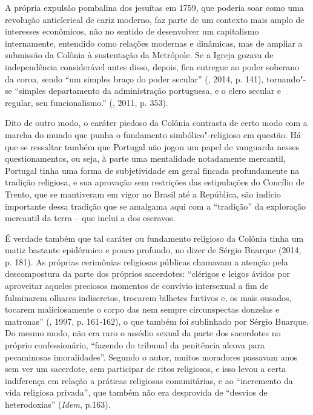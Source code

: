 {A própria expulsão pombalina dos jesuítas em 1759, que poderia soar como
uma revolução anticlerical de cariz moderno, faz parte de um contexto
mais amplo de interesses econômicos, não no sentido de desenvolver um
capitalismo internamente, entendido como relações modernas e dinâmicas,
mas de ampliar a submissão da Colônia à sustentação da Metrópole. Se a
Igreja gozava de independência considerável antes disso, depois, fica
entregue ao poder soberano da coroa, sendo ``um simples braço do poder
secular'' (, 2014, p. 141), tornando"-se ``simples departamento da
administração portuguesa, e o clero secular e regular, seu
funcionalismo.'' (, 2011, p. 353).

Dito de outro modo, o caráter piedoso da Colônia contrasta de certo modo
com a marcha do mundo que punha o fundamento simbólico"-religioso em
questão. Há que se ressaltar também que Portugal não jogou um papel de
vanguarda nesses questionamentos, ou seja, à parte uma mentalidade
notadamente mercantil, Portugal tinha uma forma de subjetividade em
geral fincada profundamente na tradição religiosa, e sua aprovação sem
restrições das estipulações do Concílio de Trento, que se mantiveram em
vigor no Brasil até a República, são indício
importante dessa tradição que se amalgama aqui com a ``tradição'' da
exploração mercantil da terra -- que inclui a dos escravos.

É verdade também que tal caráter ou fundamento religioso da Colônia
tinha um matiz bastante epidérmico e pouco profundo, no dizer de Sérgio
Buarque (2014, p. 181). As próprias cerimônias religiosas públicas
chamavam a atenção pela descompostura da parte dos próprios sacerdotes:
``clérigos e leigos ávidos por aproveitar aqueles preciosos momentos de
convívio intersexual a fim de fulminarem olhares indiscretos, trocarem
bilhetes furtivos e, os mais ousados, tocarem maliciosamente o corpo das
nem sempre circunspectas donzelas e matronas'' (, 1997, p.
161\emph{-}162), o que também foi sublinhado por Sérgio Buarque.
Do mesmo modo, não era raro o assédio sexual da parte dos sacerdotes no
próprio confessionário, ``fazendo do tribunal da penitência alcova para
pecaminosas imoralidades''. Segundo o autor, muitos moradores passavam
anos sem ver um sacerdote, sem participar de ritos religiosos, e isso
levou a certa indiferença em relação a práticas religiosas comunitárias,
e ao ``incremento da vida religiosa privada'', que também não era
desprovida de ``desvios de heterodoxias'' (\emph{Idem}, p.163).

}
